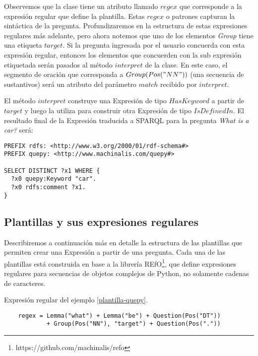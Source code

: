 Observemos que la clase tiene un atributo llamado $regex$ que corresponde a la expresión regular que define la plantilla. Estas $regex$ o patrones capturan la sintáctica de la pregunta. Profundizaremos en la estructura de estas expresiones regulares más adelante, pero ahora notemos que uno de los elementos \textit{Group} tiene una etiqueta $target$. Si la pregunta ingresada por el usuario concuerda con esta expresión regular, entonces los elementos que concuerden con la sub expresión etiquetada serán pasados al método $interpret$ de la clase. En este caso, el segmento de oración que corresponda a $Group(Pos("NN"))$ (una secuencia de sustantivos) será un atributo del parámetro $match$ recibido por $interpret$.

El método $interpret$ construye una Expresión de tipo $HasKeyword$ a partir de $target$ y luego la utiliza para construir otra Expresión de tipo $IsDefinedIn$. El resultado final de la Expresión traducida a SPARQL para la pregunta \textit{What is a car?} será:

\vspace{5mm}

\begin{lstlisting}
PREFIX rdfs: <http://www.w3.org/2000/01/rdf-schema#>
PREFIX quepy: <http://www.machinalis.com/quepy#>

SELECT DISTINCT ?x1 WHERE {
  ?x0 quepy:Keyword "car".
  ?x0 rdfs:comment ?x1.
}
\end{lstlisting}

\vspace{5mm}

\subsection{Plantillas y sus expresiones regulares}

Describiremos a continuación más en detalle la estructura de las plantillas que permiten crear una Expresión a partir de una pregunta. Cada una de las plantillas está construida en base a la librería REfO\footnote{https://github.com/machinalis/refo}, que define expresiones regulares para secuencias de objetos complejos de Python, no solamente cadenas de caracteres.

\begin{example}\label{regex} Expresión regular del ejemplo \ref{plantilla-quepy}.
    \begin{lstlisting}
    regex = Lemma("what") + Lemma("be") + Question(Pos("DT"))
            + Group(Pos("NN"), "target") + Question(Pos("."))
    \end{lstlisting}
\end{example}


